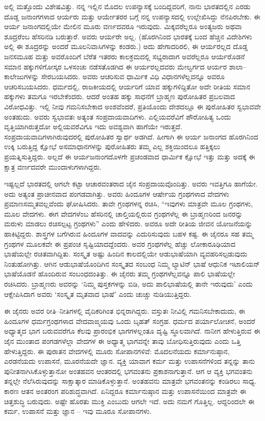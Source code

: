 ಅಲ್ಲಿ ಮತ್ತೊಂದು ವಿಶೇಷವಿತ್ತು. ನನ್ನ ಇಲ್ಲಿನ ಮೊದಲ ಉಪನ್ಯಾಸಕ್ಕೆ ಬಂದಿದ್ದವರಿಗೆ, ನಾನು ಭಾರತದಲ್ಲಿನ ಎರಡು ದೊಡ್ಡ ಜನಾಂಗಗಳಾದ ಆರ್ಯರು ಮತ್ತು ಆರ್ಯೇತರರ ಬಗ್ಗೆ ನನ್ನ ಉಪನ್ಯಾಸದಲ್ಲಿ ಉಲ್ಲೇಖಿಸಿದ್ದು ನೆನಪಿರಬೇಕು. ಈ ಆರ್ಯ ಜನಾಂಗದಲ್ಲಿಯೇ ಮೇಲಿನ ಮೂರು ವರ್ಣದವರೂ ಇರುವುದು. ಮಿಕ್ಕವರೆಲ್ಲರೂ ಅಂತ್ಯಜರು ಅಥವಾ ಶೂದ್ರರೆಂಬ ಹೆಸರಿನಡಿ ಬರುತ್ತಾರೆ. ಅವರು ಆರ್ಯರೇ ಅಲ್ಲ. (ಹೊರಗಿನಿಂದ ಭಾರತಕ್ಕೆ ಬಂದ ಹೆಚ್ಚಿನ ವಿದೇಶಿಗಳು ಅಲ್ಲಿ ಈ ಶೂದ್ರರನ್ನು ಅಂದರೆ ಮೂಲನಿವಾಸಿಗಳನ್ನು ಕಂಡರು.) ಅದು ಹೇಗಾದರಿರಲಿ, ಈ ಆರ್ಯರಲ್ಲದ ದೊಡ್ಡ ಜನಸಮೂಹ ಮತ್ತು ಅವರೊಂದಿಗೆ ಬೆರೆತ ಇತರರು ಕಾಲಕ್ರಮದಲ್ಲಿ ಸಭ್ಯರಾದಾಗ ಅವರೆಲ್ಲರೂ ಆರ್ಯರೊಡನೆ ಸಮಾನ ಹಕ್ಕುಗಳಿಗೋಸ್ಕರ ಒಳಸಂಚು ನಡೆಸತೊಡಗಿದ ಈ ಆರ್ಯರಲ್ಲದವರು ಮೇಲ್ವರ್ಗದ ಆರ್ಯರ ಶಾಲಾ–ಕಾಲೇಜುಗಳನ್ನು ಸೇರಬಯಸಿದರು. ಅವರು ಆಚರಿಸುವ ಧಾರ್ಮಿಕ ವಿಧಿ ವಿಧಾನಗಳೆಲ್ಲವನ್ನೂ ಅವರೂ ಆಚರಿಸಬಯಸಿದರು. ಧರ್ಮದಲ್ಲಿ, ರಾಜಕೀಯದಲ್ಲಿ ಆರ್ಯರಿಗೆ ಯಾವ ಹಕ್ಕುಗಳಿದ್ದಿತೋ ಅದೇ ರೀತಿಯ ಸಮಾನ ಹಕ್ಕುಗಳು ತಮಗೂ ಇರಬೇಕೆಂದರು. ಆದರೆ ಅಂತಹ ಹಕ್ಕು ಸಾಧನೆಗೆ ಬ್ರಾಹ್ಮಣ ಪುರೋಹಿತರ ಪ್ರಬಲವಾದ ವಿರೋಧವಿತ್ತು. ಇಲ್ಲಿ ನೀವು ಗಮನಿಸಬೇಕಾದ ಅಂಶವೆಂದರೆ, ಪ್ರತಿಯೊಂದು ದೇಶದಲ್ಲೂ ಈ ಪುರೋಹಿತರ ಸ್ವಭಾವವೇ ಅಂತಹುದು. ಅವರು ಸ್ವಭಾವತಃ ಅತ್ಯಂತ ಸಂಪ್ರದಾಯವಾದಿಗಳು. ಎಲ್ಲಿಯವರೆವಿಗೆ ಪೌರೋಹಿತ್ಯ ಒಂದು ವೃತ್ತಿಯಾಗಿರುತ್ತದೋ ಅಲ್ಲಿಯವರೆವಿಗೂ ಇದು ಅವಶ್ಯವಾಗಿ ಹಾಗೆಯೇ ಇರುತ್ತದೆ. ಸಂಪ್ರದಾಯವಾದಿಗಳಾಗಿರುವುದರಲ್ಲಿ ಪುರೋಹಿತರ ಸ್ವಾರ್ಥ ಅಡಗಿದೆ. ಹೀಗಾಗಿ ಈ ಆರ್ಯ ಜನಾಂಗದ ಹೊರಗಿನಿಂದ ಉಕ್ಕಿ ಬರುತ್ತಿದ್ದ ಕ್ಷೋಭೆ ಅಸಮಾಧಾನಗಳನ್ನು ಪುರೋಹಿತರು ತಮ್ಮ ಎಲ್ಲ ಶಕ್ತಿಯಿಂದಲೂ ಹತ್ತಿಕ್ಕಲು ಪ್ರಯತ್ನಿಸುತ್ತಿದ್ದರು. ಅಲ್ಲದೆ ಈ ಆರ್ಯಜನಾಂಗದೊಳಗೇ ಪ್ರಚಂಡವಾದ ಧಾರ್ಮಿಕ ಕ್ಷೋಭೆ ಇತ್ತು ಮತ್ತು ಅದಕ್ಕೆ ಈ ಕ್ಷಾತ್ರ ವರ್ಣದವರೇ ಮುಂದಾಳುಗಳಾಗಿದ್ದರು.

ಇಷ್ಟಲ್ಲದೆ ಭಾರತದಲ್ಲಿ ಆಗಲೇ ಕಟ್ಟಾ ಆಚಾರವಂತರಾದ ಜೈನ ಸಂಪ್ರದಾಯವೊಂದಿತ್ತು. ಅವರು ಇವತ್ತಿಗೂ ಹಾಗೆಯೇ. ಅದು ಅತ್ಯಂತ ಪ್ರಾಚೀನವಾದ ಪಂಗಡವಾಗಿತ್ತು. ಅವರು ಹಿಂದೂಗಳ ಆರ್ಷೇಯ ಗ್ರಂಥಗಳಾದ ವೇದಗಳು ಪ್ರಮಾಣಸಮ್ಮತವಲ್ಲವೆಂದು ಘೋಷಿಸಿದರು. ತಾವೇ ಗ್ರಂಥಗಳನ್ನ ರಚಿಸಿ, “ಇವುಗಳು ಮಾತ್ರವೇ ಮೂಲ ಗ್ರಂಥಗಳು, ಮೂಲ ವೇದಗಳು. ಈಗ ವೇದಗಳೆಂಬ ಹೆಸರಿನಲ್ಲಿ ಚಾಲ್ತಿಯಲ್ಲಿರುವ ಗ್ರಂಥಗಳೆಲ್ಲ ಈ ಬ್ರಾಹ್ಮಣರಿಂದ ಜನರನ್ನು ಮರುಳು ಮಾಡಲು ರಚಿಸಲ್ಪಟ್ಟ ಗ್ರಂಥಗಳು” ಎಂದು ಹೇಳಿದರು. ಅವರೂ ಅದೇ ರೀತಿಯ ಜೀವನ ಯೋಜನೆಯನ್ನು ಹಾಕಿಟ್ಟಿದ್ದರು. ಶಾಸ್ತ್ರಗಳ ಬಗೆಗಿರುವ ಹಿಂದೂಗಳ ವಾದವನ್ನು ಎದುರಿಸುವುದು ಬಹಳ ಕಷ್ಟ. ಈ ಜೈನರೂ ಸಹ ತಮ್ಮ ಗ್ರಂಥಗಳ ಮೂಲಕವೇ ಈ ಪ್ರಪಂಚ ಸೃಷ್ಟಿಯಾದದ್ದೆಂದರು. ಅವರ ಗ್ರಂಥಗಳೆಲ್ಲ ಹೆಚ್ಚು ಲೋಕಾರೂಢಿಯಾದ ಭಾಷೆಯಲ್ಲೇ ರಚಿತವಾಗಿದ್ದಿತು. ಸಂಸ್ಕೃತ ಅಷ್ಟು ಹಿಂದಿನ ಕಾಲದಲ್ಲಿಯೇ ಆಡುಭಾಷೆಯಾಗಿ ವ್ಯವಹರಿಸಲ್ಪಡುವುದು ನಿಂತುಹೋಗಿತ್ತು. ಆಗಿನ ಆಡುಭಾಷೆಯೊಂದಿಗಿನ ಸಂಸ್ಕೃತದ ಸಂಬಂಧ ನಿಮ್ಮ ಲ್ಯಾಟಿನ್ ಭಾಷೆ ಆಧುನಿಕ ಇಟಾಲಿಯನ್ ಭಾಷೆಯೊಡನೆ ಹೊಂದಿರುವ ಸಂಬಂಧದಂತಿತ್ತು. ಈ ಜೈನರು ತಮ್ಮ ಗ್ರಂಥಗಳೆಲ್ಲವನ್ನೂ ಪಾಲಿ ಭಾಷೆಯಲ್ಲೇ ರಚಿಸಿದರು. ಬ್ರಾಹ್ಮಣರು ಅವರನ್ನು ‘ನಿಮ್ಮ ಪುಸ್ತಕಗಳನ್ನು ಬಿಡಿ, ಅದು ಪಾಲಿಭಾಷೆಯಲ್ಲಿ ತಾನೇ ಇರುವುದು’ ಎಂದು ಆಕ್ಷೇಪಿಸಿದಾಗ ಅವರು ‘ಸಂಸ್ಕೃತ ಮೃತವಾದ ಭಾಷೆ’ ಎಂದು ಚುಚ್ಚು ನುಡಿಯುತ್ತಿದ್ದರು.

ಈ ಜೈನರು ಅವರ ರೀತಿ–ನೀತಿಗಳಲ್ಲಿ ವೈದಿಕರಿಗಿಂತ ಭಿನ್ನರಾಗಿದ್ದರು. ವಸ್ತುತಃ ನೀವಿಲ್ಲಿ ಗಮನಿಸಬೇಕಾದುದು, ಈ ಹಿಂದೂಗಳ ಧರ್ಮಗ್ರಂಥಗಳಾದ ವೇದವಾಙ್ಮಯವು ಒಂದು ಬೃಹತ್ ಸಂಗ್ರಹ. ಧರ್ಮದ ಪರ್ಯಾಲೋಚನೆ, ಅಂದರೆ ಅಧ್ಯಾತ್ಮದ ಭಾಗ ಬರುವವರೆಗೂ ಕೆಲವು ಪ್ರಾರಂಭಿಕ ಭಾಗಗಳಲ್ಲಂತೂ ದೃಷ್ಟಿ ಸ್ಥೂಲವಾಗಿದೆ. ನಾನೀಗ ಹೇಳುತ್ತಿರುವ ಈ ಜೈನ ಮುಂತಾದ ಪಂಗಡಗಳೆಲ್ಲಾ ವೇದಗಳ ಈ ಅಧ್ಯಾತ್ಮ ಭಾಗವನ್ನೇ ತಾವು ಬೋಧಿಸುತ್ತಿರುವುದು ಎಂದು ಒತ್ತಿ ಹೇಳುತ್ತಿದ್ದರು. ಈ ಪುರಾತನ ವೇದಗಳಲ್ಲಿ ಮೂರು ಸೋಪಾನಗಳಿವೆ: ಮೊದಲನೆಯದು ಕರ್ಮಾನುಷ್ಠಾನ, ಎರಡನೆಯದು ಉಪಾಸನೆ, ಮೂರನೆಯದೇ ಜ್ಞಾನ. ವ್ಯಕ್ತಿ ಯಾವಾಗ ಕರ್ಮ ಮತ್ತು ಉಪಾಸನೆಗಳಿಂದ ತನ್ನನ್ನು ತಾನು ಪುನೀತನಾಗಿಸಿಕೊಳ್ಳುತ್ತಾನೋ ಅಂತಹವನ ಆಂತರದಲ್ಲಿ ಭಗವಂತನು ಪ್ರಕಾಶನಾಗುತ್ತಾನೆ. ಆಗ ಆ ವ್ಯಕ್ತಿ ಭಗವಂತನು ತನ್ನಲ್ಲೇ ನೆಲೆಸಿರುವುದನ್ನು ಸಾಕ್ಷಾತ್ಕಾರ ಮಾಡಿಕೊಳ್ಳುತ್ತಾನೆ. ಅಂತಹವನು ಮಾತ್ರವೇ ಭಗವಂತನನ್ನು ಕಂಡಿರಲು ಸಾಧ್ಯ. ಕಾರಣ ಆತನ ಅಂತರಂಗ ಪರಿಶುದ್ಧವಾಗಿದೆ. ಏನಿದ್ದರೂ ಕರ್ಮಾನುಷ್ಠಾನ ಮತ್ತು ಉಪಾಸನೆಯಿಂದ ಮಾತ್ರವೇ ಈ ಚಿತ್ತಶುದ್ಧಿ ಬರುವುದು. ಅಷ್ಟೇ ಹೊರತು ಮುಕ್ತಿ ಎಂಬುದು ಆಗಲೇ ಇದೆ. ಅದು ನಮಗೆ ಗೊತ್ತಿಲ್ಲ. ಆದ್ದರಿಂದಲೇ ಈ ಕರ್ಮ, ಉಪಾಸನೆ ಮತ್ತು ಜ್ಞಾನ – ಇವು ಮೂರೂ ಸೋಪಾನಗಳು.

